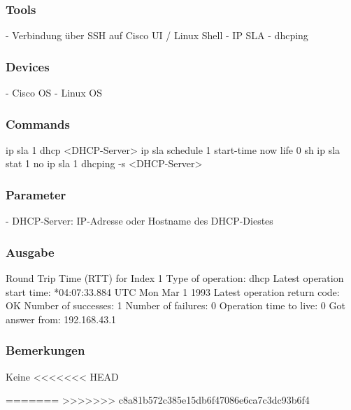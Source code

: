 \documentclass[a4,12pt]{scrartcl}
\begin{document}
\subsubsection{Tools}
- Verbindung über SSH auf Cisco UI / Linux Shell\newline
- IP SLA\newline
- dhcping\newline
\subsubsection{Devices}
- Cisco OS\newline
- Linux OS\newline
\subsubsection{Commands}
ip sla 1\newline
dhcp <DHCP-Server>\newline
ip sla schedule 1 start-time now life 0\newline
sh ip sla stat 1\newline
no ip sla 1\newline
{}
dhcping -s <DHCP-Server>
\subsubsection{Parameter}
- DHCP-Server: IP-Adresse oder Hostname des DHCP-Diestes
\subsubsection{Ausgabe}
Round Trip Time (RTT) for Index 1\newline
Type of operation: dhcp\newline
Latest operation start time: *04:07:33.884 UTC Mon Mar 1 1993\newline
Latest operation return code: OK\newline
Number of successes: 1\newline
Number of failures: 0\newline
Operation time to live: 0\newline
{}
Got answer from: 192.168.43.1
\subsubsection{Bemerkungen}
Keine
<<<<<<< HEAD

=======
>>>>>>> c8a81b572c385e15db6f47086e6ca7c3dc93b6f4
\end{document}
